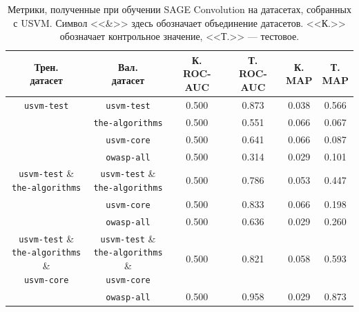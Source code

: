 \begin{table}[ht]
\begin{center}
\begin{tabular}{c|c||cc|cc}
    \makecell{Трен. \\ датасет} & \makecell{Вал. \\ датасет} & \makecell{К. \\ \textsc{ROC-AUC}} & \makecell{Т. \\ \textsc{ROC-AUC}} & \makecell{К. \\ \textsc{MAP}} & \makecell{Т. \\ \textsc{MAP}} \\
    \hline \hline
    \rule{0pt}{2.5ex}
    \texttt{usvm-test} & \texttt{usvm-test}      & 0.500 & 0.873 & 0.038 & 0.566 \\
    \cline{2-6}
    \rule{0pt}{2.5ex}
                       & \texttt{the-algorithms} & 0.500 & 0.551 & 0.066 & 0.067 \\
    \cline{2-6}
    \rule{0pt}{2.5ex}
                       & \texttt{usvm-core}      & 0.500 & 0.641 & 0.066 & 0.087 \\
    \cline{2-6}
    \rule{0pt}{2.5ex}
                       & \texttt{owasp-all}      & 0.500 & 0.314 & 0.029 & 0.101 \\
    \hline
    \makecell{
        \texttt{usvm-test} \& \\
        \texttt{the-algorithms}
    } & \makecell{
        \texttt{usvm-test} \& \\
        \texttt{the-algorithms}
    }                      & 0.500 & 0.786 & 0.053 & 0.447 \\
    \cline{2-6}
    \rule{0pt}{2.5ex}
      & \texttt{usvm-core} & 0.500 & 0.833 & 0.066 & 0.198 \\
    \cline{2-6}
    \rule{0pt}{2.5ex}
      & \texttt{owasp-all} & 0.500 & 0.636 & 0.029 & 0.260 \\
    \hline
    \makecell{
        \texttt{usvm-test} \& \\
        \texttt{the-algorithms} \& \\
        \texttt{usvm-core}
    } & \makecell{
        \texttt{usvm-test} \& \\
        \texttt{the-algorithms} \& \\
        \texttt{usvm-core}
    }                      & 0.500 & 0.821 & 0.058 & 0.593 \\
    \cline{2-6}
    \rule{0pt}{2.5ex}
      & \texttt{owasp-all} & 0.500 & 0.958 & 0.029 & 0.873 \\
\end{tabular}
\caption{\label{usvm-train-ds-val-results} Метрики, полученные при обучении SAGE Convolution на датасетах, собранных с USVM. Символ <<\&>> здесь обозначает объединение датасетов. <<К.>> обозначает контрольное значение, <<Т.>> --- тестовое.}
\end{center}
\end{table}

